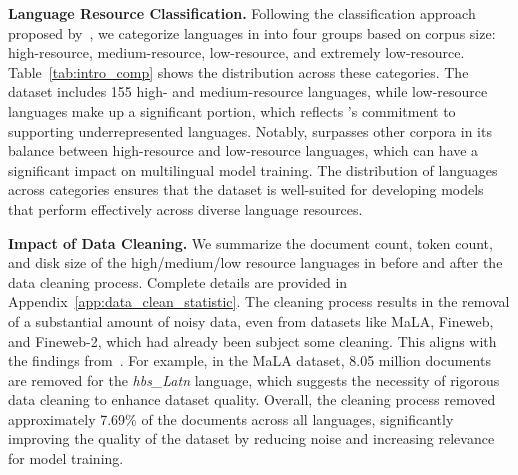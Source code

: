 \noindent\textbf{Language Resource Classification.}
Following the classification approach proposed by~\citet{goyal-etal-2022-flores}, we categorize languages in \dcad into four groups based on corpus size: high-resource, medium-resource, low-resource, and extremely low-resource.
Table~\ref{tab:intro_comp} shows the distribution across these categories.
The dataset includes 155 high- and medium-resource languages, while low-resource languages make up a significant portion, which reflects \dcad's commitment to supporting underrepresented languages.
Notably, \dcad surpasses other corpora in its balance between high-resource and low-resource languages, which can have a significant impact on multilingual model training.
The distribution of languages across categories ensures that the dataset is well-suited for developing models that perform effectively across diverse language resources.

% 

\noindent\textbf{Impact of Data Cleaning.}
We summarize the document count, token count, and disk size of the high/medium/low resource languages in \dcad before and after the data cleaning process.
Complete details are provided in Appendix~\ref{app:data_clean_statistic}.
The cleaning process results in the removal of a substantial amount of noisy data, even from datasets like MaLA, Fineweb, and Fineweb-2, which had already been subject some cleaning.
This aligns with the findings from~\cite{dou-etal-2024-sailor,zhang-etal-2024-mc2}.
For example, in the MaLA dataset, 8.05 million documents are removed for the \textit{hbs\_Latn} language, which suggests the necessity of rigorous data cleaning to enhance dataset quality.
Overall, the cleaning process removed approximately 7.69\% of the documents across all languages, significantly improving the quality of the dataset by reducing noise and increasing relevance for model training.